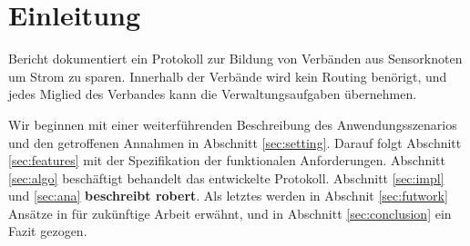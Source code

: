 \section{Einleitung} \label{sec:intro}
 Bericht dokumentiert ein Protokoll zur Bildung von Verb\"anden aus Sensorknoten um Strom zu sparen. Innerhalb der Verb\"ande wird kein Routing ben\"origt, und jedes Miglied des Verbandes kann die Verwaltungsaufgaben \"ubernehmen.

Wir beginnen mit einer weiterf\"uhrenden Beschreibung des Anwendungsszenarios und den getroffenen Annahmen in Abschnitt \ref{sec:setting}.
Darauf folgt Abschnitt \ref{sec:features} mit der Spezifikation der funktionalen Anforderungen.
Abschnitt \ref{sec:algo} besch\"aftigt behandelt das entwickelte Protokoll.
Abschnitt \ref{sec:impl} und \ref{sec:ana} \textbf{beschreibt robert}.
Als letztes werden in Abschnit \ref{sec:futwork} Ans\"atze in f\"ur zuk\"unftige Arbeit erw\"ahnt, und in Abschnitt \ref{sec:conclusion} ein Fazit gezogen.
